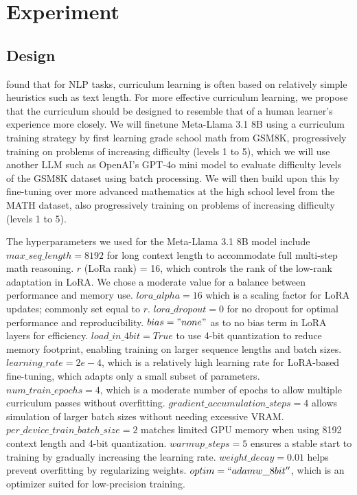 \section{Experiment}

\subsection{Design}

\citet{soviany2022curriculumlearningsurvey} found that for NLP tasks, curriculum learning is often based on relatively simple heuristics such as text length. For more effective curriculum learning, we propose that the curriculum should be designed to resemble that of a human learner’s experience more closely. We will finetune Meta-Llama 3.1 8B using a curriculum training strategy by first learning grade school math from GSM8K, progressively training on problems of increasing difficulty (levels 1 to 5), which we will use another LLM such as OpenAI's GPT-4o mini model to evaluate difficulty levels of the GSM8K dataset using batch processing. We will then build upon this by fine-tuning over more advanced mathematics at the high school level from the MATH dataset, also progressively training on problems of increasing difficulty (levels 1 to 5).

The hyperparameters we used for the Meta-Llama 3.1 8B model include $max\_seq\_length = 8192$ for long context length to accommodate full multi-step math reasoning. $r$ (LoRa rank) = 16, which controls the rank of the low-rank adaptation in LoRA. We chose a moderate value for a balance between performance and memory use. $lora\_alpha = 16$ which is a scaling factor for LoRA updates; commonly set equal to $r$. $lora\_dropout = 0$ for no dropout for optimal performance and reproducibility. $bias = "none"$ as to no bias term in LoRA layers for efficiency.  $load\_in\_4bit = True$ to use 4-bit quantization to reduce memory footprint, enabling training on larger sequence lengths and batch sizes. $learning\_rate = 2e-4$, which is a relatively high learning rate for LoRA-based fine-tuning, which adapts only a small subset of parameters. $num\_train\_epochs = 4$, which is a moderate number of epochs to allow multiple curriculum passes without overfitting. $gradient\_accumulation\_steps = 4$	allows simulation of larger batch sizes without needing excessive VRAM. $per\_device\_train\_batch\_size = 2$ matches limited GPU memory when using 8192 context length and 4-bit quantization. $warmup\_steps = 5$ ensures a stable start to training by gradually increasing the learning rate. $weight\_decay = 0.01$ helps prevent overfitting by regularizing weights. $optim	= ``adamw\_8bit''$, which is an optimizer suited for low-precision training.

